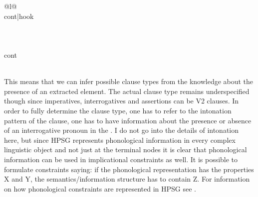 \begin{tabular}[t]{@{}l@{}}
{{{{{{{                                                                    }\\
                                                                cont|hook \\
                                                              }\\
                                                  } }\\
                         }\\
                   cont \\     
             }\\
}
\end{tabular}
\label{lr-verb-movement-clause-type}
\z



This means that we can infer possible clause types from the knowledge about the presence of an
extracted element. The actual clause type remains underspecified though since imperatives,
interrogatives and assertions can be V2 clauses. 
In order to fully determine the clause type, one has to refer to the intonation pattern of the
clause, one has to have information about the presence or absence of an interrogative pronoun in the
\vf. I do not go into the details of intonation here, but since HPSG represents phonological
information in every complex linguistic object and not just at the terminal nodes it is clear that
phonological information can be used in implicational constraints as well. It is possible to
formulate constraints saying: if the phonological representation has the properties X and Y, the
semantics/information structure has to contain Z. For information on how phonological constraints
are represented in HPSG see . 

